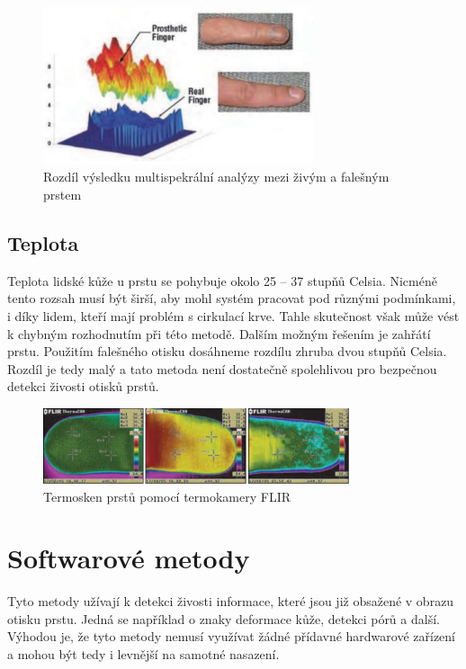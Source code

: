 \begin{figure}[!htbp]
    \centering
    \includegraphics[width=300px]{obrazky-figures/multispectralAnalysis.PNG}
    \caption{Rozdíl výsledku multispekrální analýzy mezi živým a falešným prstem \cite{AdvancedBiometricsTechnologies2011}}
\end{figure}

\subsection*{Teplota}
Teplota lidské kůže u prstu se pohybuje okolo 25 -- 37 stupňů Celsia. Nicméně tento rozsah musí být širší, aby mohl systém pracovat pod různými podmínkami, i díky lidem, kteří mají problém s cirkulací krve. Tahle skutečnost však může vést k chybným rozhodnutím při této metodě. Dalším možným řešením je zahřátí prstu. Použitím falešného otisku dosáhneme rozdílu zhruba dvou stupňů Celsia. Rozdíl je tedy malý a tato metoda není dostatečně spolehlivou pro bezpečnou detekci živosti otisků prstů. \cite{AdvancedBiometricsTechnologies2011}
\begin{figure}[!htbp]
    \centering
    \includegraphics[width=340px]{obrazky-figures/thermoscan.PNG}
    \caption{Termosken prstů pomocí termokamery FLIR \cite{AdvancedBiometricsTechnologies2011}}
\end{figure}

\section{Softwarové metody}
Tyto metody užívají k detekci živosti informace, které jsou již obsažené v obrazu otisku prstu. Jedná se například o znaky deformace kůže, detekci pórů a další. Výhodou je, že tyto metody nemusí využívat žádné přídavné hardwarové zařízení a mohou být tedy i levnější na samotné nasazení.


